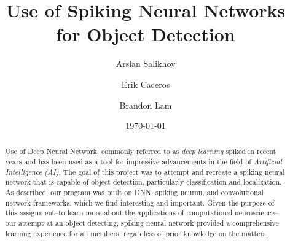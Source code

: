 \documentclass{article}
\title{Use of Spiking Neural Networks for Object Detection}
\author{Arslan Salikhov \\
	\and 
	Erik Caceros \\
	\and
	Brandon Lam \\
	}
\date{\today}
\begin{document}
\begin{titlingpage}
\maketitle
\begin{abstract}
	Use of Deep Neural Network, commonly referred to as
	\emph{deep learning} spiked in recent years and has been used
	as a tool for impressive advancements in the field of 
	\emph{Artificial Intelligence (AI)}.
	The goal of this project was to attempt and recreate a spiking neural network that is capable of object detection, particularly classification and localization. As described, our program was built on DNN, spiking neuron, and convolutional network frameworks.  which we find interesting and important. Given the purpose of this assignment–to learn more about the applications of computational neuroscience–our attempt at an object detecting, spiking neural network provided a comprehensive learning experience for all members, regardless of prior knowledge on the matters. 
	\end{abstract}
\end{titlingpage}


\tableofcontents
\newpage







\newpage



\end{document}
